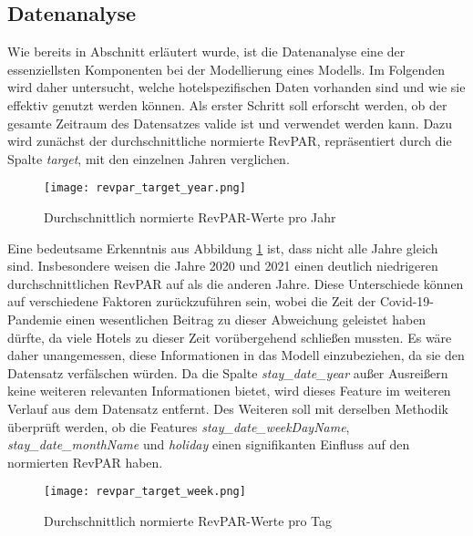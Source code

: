 \subsection{Datenanalyse}
\label{subsec:revpar_analyse}

Wie bereits in Abschnitt \emph{} erläutert wurde, ist die Datenanalyse eine der essenziellsten Komponenten bei der Modellierung eines Modells. Im Folgenden wird daher untersucht, welche hotelspezifischen Daten vorhanden sind und wie sie effektiv genutzt werden können.
\newline
\newline
Als erster Schritt soll erforscht werden, ob der gesamte Zeitraum des Datensatzes valide ist und verwendet werden kann. Dazu wird zunächst der durchschnittliche normierte RevPAR, repräsentiert durch die Spalte \emph{target}, mit den einzelnen Jahren verglichen.
\newpage
\begin{figure}[h]
    \centering
    \texttt{[image: revpar\_target\_year.png]}
    \caption[Durchschnittlich normierte RevPAR-Werte pro Jahr]{Durchschnittlich normierte RevPAR-Werte pro Jahr}
    \label{img:revpar_target_year}
\end{figure}

Eine bedeutsame Erkenntnis aus Abbildung \ref{img:revpar_target_year} ist, dass nicht alle Jahre gleich sind. Insbesondere weisen die Jahre 2020 und 2021 einen deutlich niedrigeren durchschnittlichen RevPAR auf als die anderen Jahre. Diese Unterschiede können auf verschiedene Faktoren zurückzuführen sein, wobei die Zeit der Covid-19-Pandemie einen wesentlichen Beitrag zu dieser Abweichung geleistet haben dürfte, da viele Hotels zu dieser Zeit vorübergehend schließen mussten. Es wäre daher unangemessen, diese Informationen in das Modell einzubeziehen, da sie den Datensatz verfälschen würden. Da die Spalte 
\emph{stay\_date\_year} außer Ausreißern keine weiteren relevanten Informationen bietet, wird dieses Feature im weiteren Verlauf aus dem Datensatz entfernt.
\newline
\newline
Des Weiteren soll mit derselben Methodik überprüft werden, ob die Features
\newline 
\emph{stay\_date\_weekDayName}, \emph{stay\_date\_monthName} und \emph{holiday} einen signifikanten Einfluss auf den normierten RevPAR haben.

\newpage
\begin{figure}[h]
    \centering
    \texttt{[image: revpar\_target\_week.png]}
    \caption[Durchschnittlich normierte RevPAR-Werte pro Tag]{Durchschnittlich normierte RevPAR-Werte pro Tag}
    \label{img:revpar_target_week}
\end{figure}

